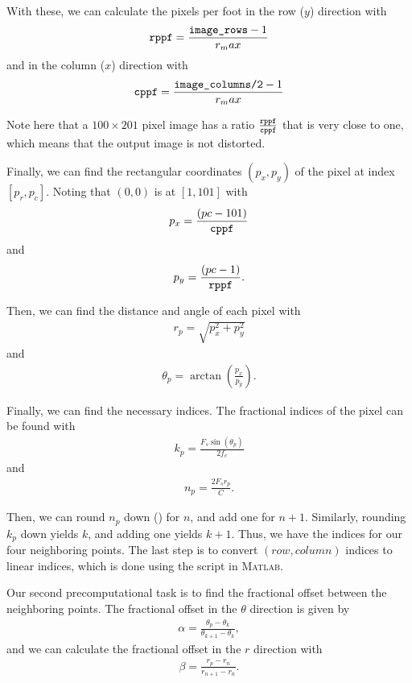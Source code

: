 With these, we can calculate the pixels per foot in the row ($y$) direction with
\begin{align*}
    \texttt{rppf} = \frac{\texttt{image\_rows}-1}{r_max}
\end{align*}
and in the column ($x$) direction with
\begin{align*}
    \texttt{cppf} = \frac{\texttt{image\_columns/2}-1}{r_max}
\end{align*}

Note here that a $100 \times 201$ pixel image has a ratio $\frac{\texttt{rppf}}{\texttt{cppf}}$ that is very close to one, which means that the output image is not distorted.

Finally, we can find the rectangular coordinates $(p_x, p_y)$ of the pixel at index $[p_r,p_c]$.  Noting that $(0,0)$ is at $[1,101]$ with
\begin{align*}
    p_x = \frac{(pc-101)}{\texttt{cppf}}
\end{align*}
and
\begin{align*}
    p_y = \frac{(pc-1)}{\texttt{rppf}}.
\end{align*}

Then, we can find the distance and angle of each pixel with
\begin{align*}
    r_p = \sqrt{p_x^2 + p_y^2}
\end{align*}
and
\begin{align*}
    \theta_p = \arctan(\frac{p_x}{p_y}).
\end{align*}

Finally, we can find the necessary indices.  The fractional indices of the pixel can be found with
\begin{align*}
    k_p = \frac{F_s \sin(\theta_p)}{2 f_c}
\end{align*}
and
\begin{align*}
    n_p = \frac{2F_sr_p}{C}.
\end{align*}

Then, we can round $n_p$ down () for $n$, and add one for $n+1$.  Similarly, rounding $k_p$ down yields $k$, and adding one yields $k+1$.  Thus, we have the indices for our four neighboring points.  The last step is to convert $(row,column)$ indices to linear indices, which is done using the  script in \textsc{Matlab}.

Our second precomputational task is to find the fractional offset between the neighboring points.  The fractional offset in the $\theta$ direction is given by
\begin{align*}
    \alpha = \frac{\theta_p - \theta_k}{\theta_{k+1}-\theta_k},
\end{align*}
and we can calculate the fractional offset in the $r$ direction with
\begin{align*}
    \beta = \frac{r_p - r_n}{r_{n+1}-r_n}.
\end{align*}

